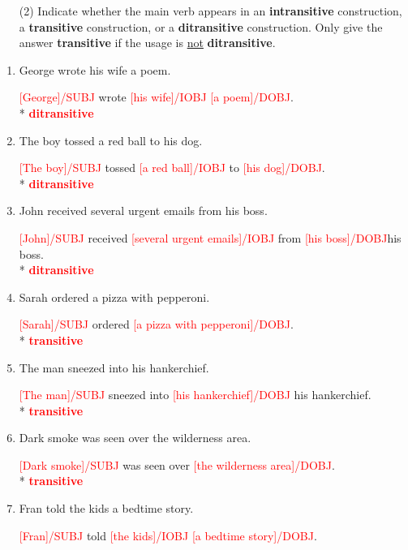 \documentclass[11pt]{article}
\begin{document}
\begin{enumerate}
\begin{enumerate}
\item[(2)]
 Indicate whether the main verb appears in an {\bf intransitive} construction, a {\bf transitive} construction, or a
  {\bf ditransitive} construction. Only give the answer {\bf
    transitive} if the usage is \underline{not} {\bf ditransitive}. \\
\end{enumerate}


\begin{enumerate}

\item George wrote his wife a poem. 
\par \textcolor{red}{[George]/SUBJ} wrote \textcolor{red}{[his wife]/IOBJ} \textcolor{red}{[a poem]/DOBJ}.
\\* \textcolor{red}{{\bf ditransitive}}
\item The boy tossed a red ball to his dog. 
\par \textcolor{red}{[The boy]/SUBJ} tossed \textcolor{red}{[a red ball]/IOBJ} to \textcolor{red}{[his dog]/DOBJ}.
\\* \textcolor{red}{{\bf ditransitive}}
\item John received several urgent emails from his boss. 
\par \textcolor{red}{[John]/SUBJ} received \textcolor{red}{[several urgent emails]/IOBJ} from \textcolor{red}{[his boss]/DOBJ}his boss.
\\* \textcolor{red}{{\bf ditransitive}}
\item Sarah ordered a pizza with pepperoni. 
\par \textcolor{red}{[Sarah]/SUBJ} ordered \textcolor{red}{[a pizza with pepperoni]/DOBJ}. 
\\* \textcolor{red}{{\bf transitive}}
\item The man sneezed into his hankerchief.
\par \textcolor{red}{[The man]/SUBJ} sneezed into \textcolor{red}{[his hankerchief]/DOBJ} his hankerchief.
\\* \textcolor{red}{{\bf transitive}}
\item Dark smoke was seen over the wilderness area.
\par \textcolor{red}{[Dark smoke]/SUBJ} was seen over \textcolor{red}{[the wilderness area]/DOBJ}.
\\* \textcolor{red}{{\bf transitive}}
\item Fran told the kids a bedtime story.
\par \textcolor{red}{[Fran]/SUBJ} told \textcolor{red}{[the kids]/IOBJ} \textcolor{red}{[a bedtime story]/DOBJ}. 

\end{enumerate}
\end{enumerate}
\end{document}

